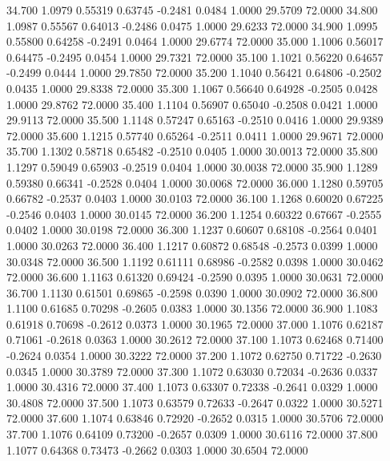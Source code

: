   34.700   1.0979   0.55319   0.63745  -0.2481   0.0484   1.0000  29.5709  72.0000
  34.800   1.0987   0.55567   0.64013  -0.2486   0.0475   1.0000  29.6233  72.0000
  34.900   1.0995   0.55800   0.64258  -0.2491   0.0464   1.0000  29.6774  72.0000
  35.000   1.1006   0.56017   0.64475  -0.2495   0.0454   1.0000  29.7321  72.0000
  35.100   1.1021   0.56220   0.64657  -0.2499   0.0444   1.0000  29.7850  72.0000
  35.200   1.1040   0.56421   0.64806  -0.2502   0.0435   1.0000  29.8338  72.0000
  35.300   1.1067   0.56640   0.64928  -0.2505   0.0428   1.0000  29.8762  72.0000
  35.400   1.1104   0.56907   0.65040  -0.2508   0.0421   1.0000  29.9113  72.0000
  35.500   1.1148   0.57247   0.65163  -0.2510   0.0416   1.0000  29.9389  72.0000
  35.600   1.1215   0.57740   0.65264  -0.2511   0.0411   1.0000  29.9671  72.0000
  35.700   1.1302   0.58718   0.65482  -0.2510   0.0405   1.0000  30.0013  72.0000
  35.800   1.1297   0.59049   0.65903  -0.2519   0.0404   1.0000  30.0038  72.0000
  35.900   1.1289   0.59380   0.66341  -0.2528   0.0404   1.0000  30.0068  72.0000
  36.000   1.1280   0.59705   0.66782  -0.2537   0.0403   1.0000  30.0103  72.0000
  36.100   1.1268   0.60020   0.67225  -0.2546   0.0403   1.0000  30.0145  72.0000
  36.200   1.1254   0.60322   0.67667  -0.2555   0.0402   1.0000  30.0198  72.0000
  36.300   1.1237   0.60607   0.68108  -0.2564   0.0401   1.0000  30.0263  72.0000
  36.400   1.1217   0.60872   0.68548  -0.2573   0.0399   1.0000  30.0348  72.0000
  36.500   1.1192   0.61111   0.68986  -0.2582   0.0398   1.0000  30.0462  72.0000
  36.600   1.1163   0.61320   0.69424  -0.2590   0.0395   1.0000  30.0631  72.0000
  36.700   1.1130   0.61501   0.69865  -0.2598   0.0390   1.0000  30.0902  72.0000
  36.800   1.1100   0.61685   0.70298  -0.2605   0.0383   1.0000  30.1356  72.0000
  36.900   1.1083   0.61918   0.70698  -0.2612   0.0373   1.0000  30.1965  72.0000
  37.000   1.1076   0.62187   0.71061  -0.2618   0.0363   1.0000  30.2612  72.0000
  37.100   1.1073   0.62468   0.71400  -0.2624   0.0354   1.0000  30.3222  72.0000
  37.200   1.1072   0.62750   0.71722  -0.2630   0.0345   1.0000  30.3789  72.0000
  37.300   1.1072   0.63030   0.72034  -0.2636   0.0337   1.0000  30.4316  72.0000
  37.400   1.1073   0.63307   0.72338  -0.2641   0.0329   1.0000  30.4808  72.0000
  37.500   1.1073   0.63579   0.72633  -0.2647   0.0322   1.0000  30.5271  72.0000
  37.600   1.1074   0.63846   0.72920  -0.2652   0.0315   1.0000  30.5706  72.0000
  37.700   1.1076   0.64109   0.73200  -0.2657   0.0309   1.0000  30.6116  72.0000
  37.800   1.1077   0.64368   0.73473  -0.2662   0.0303   1.0000  30.6504  72.0000
